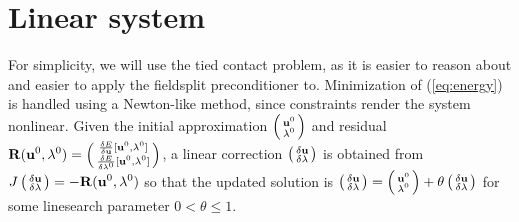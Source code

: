 \documentclass[11pt]{article}
\newcommand{\vecu}{{\bf u}}
\newcommand{\vecR}{{\bf R}}
\begin{document}
\section{Linear system}
For simplicity, we will use the tied contact problem, as it is easier to reason about and easier to apply the fieldsplit preconditioner to.
Minimization of (\ref{eq:energy}) is handled using a Newton-like method, since  constraints render the system nonlinear.
Given the initial approximation $\displaystyle{\left(\begin{smallmatrix}\vecu^0\\ \lambda^0\end{smallmatrix}\right)}$ and residual
$\displaystyle{\vecR(\vecu^0,\lambda^0) = \left(\begin{smallmatrix}\frac{\delta E}{\delta \vecu}[\vecu^0,\lambda^0]\\ \frac{\delta E}{\delta \lambda^0}[\vecu^0,\lambda^0]\end{smallmatrix}\right)}$,
a linear correction $\displaystyle{\left(\begin{smallmatrix}\delta \vecu\\ \delta \lambda\end{smallmatrix}\right)}$ is obtained from
$\displaystyle{J \left(\begin{smallmatrix}\delta \vecu\\ \delta \lambda\end{smallmatrix}\right) = -\vecR(\vecu^0,\lambda^0)}$
so that the updated solution is $\displaystyle{\left(\begin{smallmatrix}\delta \vecu\\ \delta \lambda\end{smallmatrix}\right) =
\left(\begin{smallmatrix}\vecu^0\\ \lambda^0\end{smallmatrix}\right) + \theta \left(\begin{smallmatrix}\delta \vecu\\ \delta \lambda\end{smallmatrix}\right)}$
for some linesearch parameter $0 < \theta \leq 1$.
\end{document}
